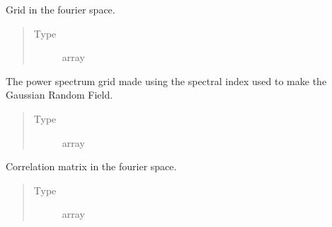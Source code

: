 \documentclass[letterpaper,10pt,english]{sphinxmanual}
\begin{document}
\begin{fulllineitems}
\begin{fulllineitems}
\begin{quote}
\begin{description}
\end{description}\end{quote}

\end{fulllineitems}


\begin{fulllineitems}
\label{\detokenize{gaussClass:gaussClass.GaussianRandomField.k_ind}}
\sphinxAtStartPar
Grid in the fourier space.
\begin{quote}\begin{description}
\item[{Type}] \leavevmode
\sphinxAtStartPar
array

\end{description}\end{quote}

\end{fulllineitems}


\begin{fulllineitems}
\label{\detokenize{gaussClass:gaussClass.GaussianRandomField.PowerSpectrum}}
\sphinxAtStartPar
The power spectrum grid made using the spectral index used to make the Gaussian Random Field.
\begin{quote}\begin{description}
\item[{Type}] \leavevmode
\sphinxAtStartPar
array

\end{description}\end{quote}

\end{fulllineitems}


\begin{fulllineitems}
\label{\detokenize{gaussClass:gaussClass.GaussianRandomField.corr_s}}
\sphinxAtStartPar
Correlation matrix in the fourier space.
\begin{quote}\begin{description}
\item[{Type}] \leavevmode
\sphinxAtStartPar
array


\end{description}
\end{quote}
\end{fulllineitems}
\end{fulllineitems}
\end{document}
